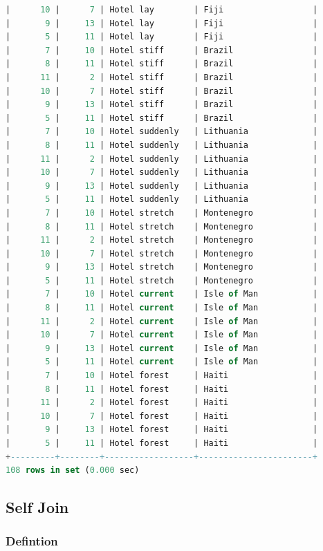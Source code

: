 \documentclass[11pt]{article}
\begin{document}
\begin{lstlisting}[language=sql]
|      10 |      7 | Hotel lay        | Fiji                  |
|       9 |     13 | Hotel lay        | Fiji                  |
|       5 |     11 | Hotel lay        | Fiji                  |
|       7 |     10 | Hotel stiff      | Brazil                |
|       8 |     11 | Hotel stiff      | Brazil                |
|      11 |      2 | Hotel stiff      | Brazil                |
|      10 |      7 | Hotel stiff      | Brazil                |
|       9 |     13 | Hotel stiff      | Brazil                |
|       5 |     11 | Hotel stiff      | Brazil                |
|       7 |     10 | Hotel suddenly   | Lithuania             |
|       8 |     11 | Hotel suddenly   | Lithuania             |
|      11 |      2 | Hotel suddenly   | Lithuania             |
|      10 |      7 | Hotel suddenly   | Lithuania             |
|       9 |     13 | Hotel suddenly   | Lithuania             |
|       5 |     11 | Hotel suddenly   | Lithuania             |
|       7 |     10 | Hotel stretch    | Montenegro            |
|       8 |     11 | Hotel stretch    | Montenegro            |
|      11 |      2 | Hotel stretch    | Montenegro            |
|      10 |      7 | Hotel stretch    | Montenegro            |
|       9 |     13 | Hotel stretch    | Montenegro            |
|       5 |     11 | Hotel stretch    | Montenegro            |
|       7 |     10 | Hotel current    | Isle of Man           |
|       8 |     11 | Hotel current    | Isle of Man           |
|      11 |      2 | Hotel current    | Isle of Man           |
|      10 |      7 | Hotel current    | Isle of Man           |
|       9 |     13 | Hotel current    | Isle of Man           |
|       5 |     11 | Hotel current    | Isle of Man           |
|       7 |     10 | Hotel forest     | Haiti                 |
|       8 |     11 | Hotel forest     | Haiti                 |
|      11 |      2 | Hotel forest     | Haiti                 |
|      10 |      7 | Hotel forest     | Haiti                 |
|       9 |     13 | Hotel forest     | Haiti                 |
|       5 |     11 | Hotel forest     | Haiti                 |
+---------+--------+------------------+-----------------------+
108 rows in set (0.000 sec)
\end{lstlisting}

\subsection{Self Join}

\subsubsection*{Defintion}
\end{document}
